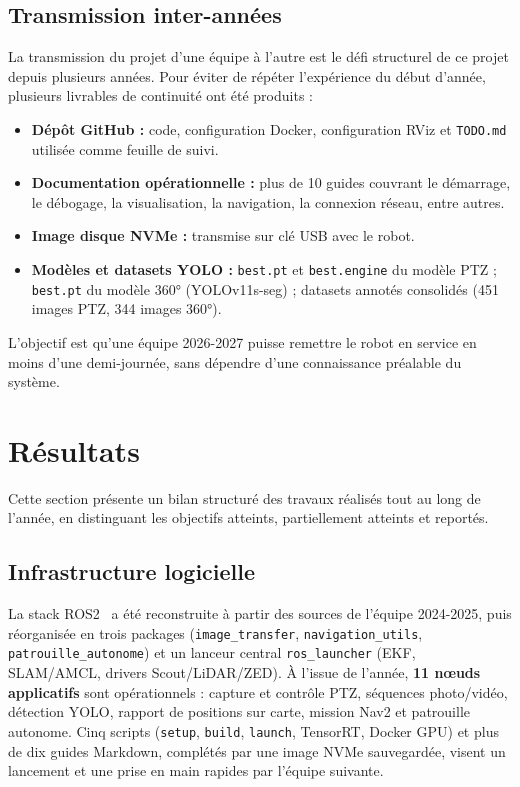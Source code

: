 \documentclass[12pt,a4paper]{article}
\begin{document}
\subsection{Transmission inter-années}

La transmission du projet d'une équipe à l'autre est le défi structurel de ce projet depuis plusieurs années. Pour éviter de répéter l'expérience du début d'année, plusieurs livrables de continuité ont été produits :

\begin{itemize}
    \item \textbf{Dépôt GitHub :} code, configuration Docker, configuration RViz et \texttt{TODO.md} utilisée comme feuille de suivi.
    \item \textbf{Documentation opérationnelle :} plus de 10 guides couvrant le démarrage, le débogage, la visualisation, la navigation, la connexion réseau, entre autres.
    \item \textbf{Image disque NVMe :} transmise sur clé USB avec le robot.
    \item \textbf{Modèles et datasets YOLO :} \texttt{best.pt} et \texttt{best.engine}  du modèle PTZ ; \texttt{best.pt} du modèle 360° (YOLOv11s-seg) ; datasets annotés consolidés (451 images PTZ, 344 images 360°).
\end{itemize}

L'objectif est qu'une équipe 2026-2027 puisse remettre le robot en service en moins d'une demi-journée, sans dépendre d'une connaissance préalable du système.

\section{Résultats}

Cette section présente un bilan structuré des travaux réalisés tout au long de l'année, en distinguant les objectifs atteints, partiellement atteints et reportés.

\subsection{Infrastructure logicielle}

La stack ROS2~\cite{ros2} a été reconstruite à partir des sources de l'équipe 2024-2025, puis réorganisée en trois packages (\texttt{image\_transfer}, \texttt{navigation\_utils}, \texttt{patrouille\_autonome}) et un lanceur central \texttt{ros\_launcher} (EKF, SLAM/AMCL, drivers Scout/LiDAR/ZED). À l'issue de l'année, \textbf{11 nœuds applicatifs} sont opérationnels : capture et contrôle PTZ, séquences photo/vidéo, détection YOLO, rapport de positions sur carte, mission Nav2 et patrouille autonome. Cinq scripts (\texttt{setup}, \texttt{build}, \texttt{launch}, TensorRT, Docker GPU) et plus de dix guides Markdown, complétés par une image NVMe sauvegardée, visent un lancement et une prise en main rapides par l'équipe suivante.
\end{document}
